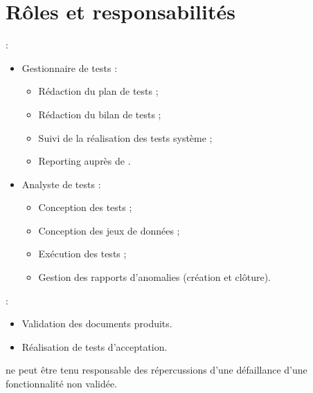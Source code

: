 
\section{Rôles et responsabilités}
\label{sec:resp}

{\equipe} :
\begin{itemize}
    \item Gestionnaire de tests :
    \begin{itemize}
        \item Rédaction du plan de tests ;
        \item Rédaction du bilan de tests ;
        \item Suivi de la réalisation des tests système ;
        \item Reporting auprès de {\client}.
    \end{itemize}
    \item Analyste de tests :
    \begin{itemize}
        \item Conception des tests ;
        \item Conception des jeux de données ;
        \item Exécution des tests ;
        \item Gestion des rapports d'anomalies (création et clôture).
    \end{itemize}
\end{itemize}

{\client} :
\begin{itemize}
    \item Validation des documents produits.
    \item Réalisation de tests d'acceptation.
\end{itemize}

{\equipe} ne peut être tenu responsable des répercussions d'une défaillance d'une fonctionnalité non validée. 
